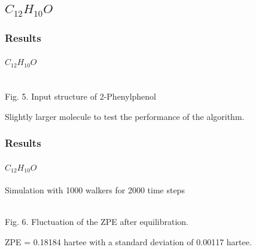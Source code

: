 \documentclass{beamer}
\begin{document}
\subsection{$C_{12} H_{10} O$}

\begin{frame}
\frametitle{Results}
\framesubtitle{$C_{12} H_{10} O$}
\begin{center}
\\
Fig. 5. Input structure of 2-Phenylphenol
\end{center}
Slightly larger molecule to test the performance of the algorithm.
\end{frame}

\begin{frame}
\frametitle{Results}
\framesubtitle{$C_{12} H_{10} O$}
Simulation with 1000 walkers for 2000 time steps
\begin{center}
\\
Fig. 6. Fluctuation of the ZPE after equilibration.
\end{center}
ZPE = 0.18184 hartee with a standard deviation of 0.00117 hartee.\\


\end{frame}
\end{document}

